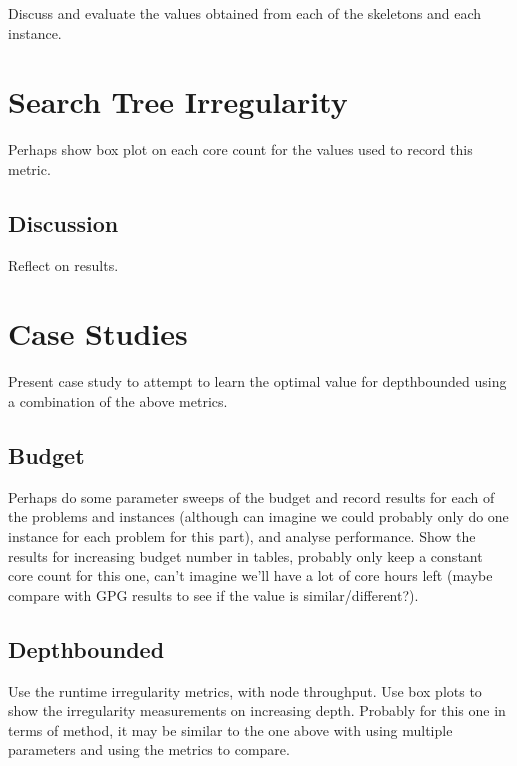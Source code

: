 \documentclass[11pt,a4paper]{article}
\begin{document}
Discuss and evaluate the values obtained from each of the skeletons and each instance. 

\section{Search Tree Irregularity}

Perhaps show box plot on each core count for the values used to record this metric.

\subsection{Discussion}

Reflect on results.

\section{Case Studies}

Present case study to attempt to learn the optimal value for depthbounded using a combination of the above metrics.

\subsection{Budget}
\label{sec:budget}
Perhaps do some parameter sweeps of the budget and record results for each of the problems and instances (although can imagine we could probably only do one instance for each problem
for this part), and analyse performance. Show the results for increasing budget number in tables, probably only keep a constant core count for this one, can't imagine we'll have a
lot of core hours left (maybe compare with GPG results to see if the value is similar/different?).

\subsection{Depthbounded}
\label{sec:depthbounded}
Use the runtime irregularity metrics, with node throughput. Use box plots to show the irregularity measurements on increasing depth. Probably for this one in terms of method,
it may be similar to the one above with using multiple parameters and using the metrics to compare.
\end{document}
